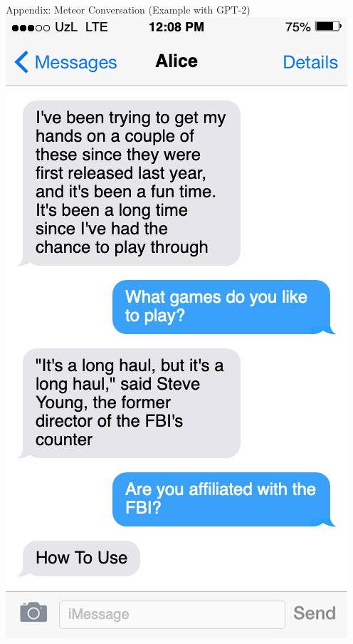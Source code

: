 \documentclass[10pt]{beamer}
\begin{document}
\begin{frame}{Appendix: Meteor Conversation (Example with GPT-2)}
	\centering
	\includegraphics[height=0.9\textheight]{twoway_gpt.png}
\end{frame}
\end{document}
